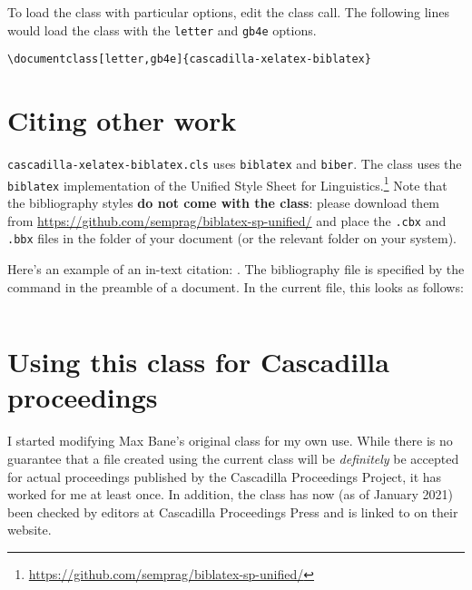 \documentclass{cascadilla-xelatex-biblatex}
\begin{document}
To load the class with particular options, edit the class call. The following
lines would load the class with the \texttt{letter} and \texttt{gb4e} options.

\begin{lstlisting}
\documentclass[letter,gb4e]{cascadilla-xelatex-biblatex}
\end{lstlisting}

\section{Citing other work}\label{sec:bib}

\texttt{cascadilla-xelatex-biblatex.cls} uses \texttt{biblatex} and
\texttt{biber}. The class uses the \texttt{biblatex} implementation of the
Unified Style Sheet for
Linguistics.\footnote{\url{https://github.com/semprag/biblatex-sp-unified/}}
Note that the bibliography styles \textbf{do not come with the class}: please
download them from \url{https://github.com/semprag/biblatex-sp-unified/} and
place the \texttt{.cbx} and \texttt{.bbx} files in the folder of your document
(or the relevant folder on your system).

Here's an example of an in-text citation: \textcite{EKiss2008}. The
bibliography file is specified by the \verb++ command in the
preamble of a document. In the current file, this looks as follows:

\begin{lstlisting}

\end{lstlisting}

\section{Using this class for Cascadilla proceedings}

I started modifying Max Bane's original class for my own use. While there is no
guarantee that a file created using the current class will be \emph{definitely}
be accepted for actual proceedings published by the Cascadilla Proceedings
Project, it has worked for me at least once. In addition, the class has now (as
of January 2021) been checked by editors at Cascadilla Proceedings Press and is
linked to on their website.

\printbibliography
\end{document}
